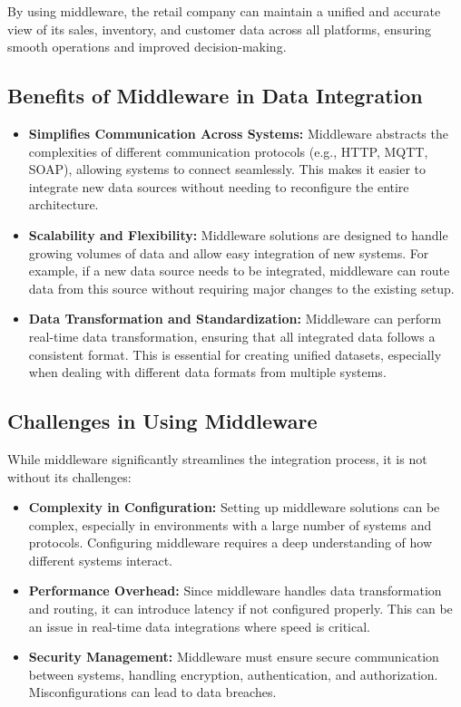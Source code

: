 \documentclass[12pt]{article}
\begin{document}
By using middleware, the retail company can maintain a unified and accurate view of its sales, inventory, and customer data across all platforms, ensuring smooth operations and improved decision-making.

\subsection{Benefits of Middleware in Data Integration}
\begin{itemize}
    \item \textbf{Simplifies Communication Across Systems:} Middleware abstracts the complexities of different communication protocols (e.g., HTTP, MQTT, SOAP), allowing systems to connect seamlessly. This makes it easier to integrate new data sources without needing to reconfigure the entire architecture.
    \item \textbf{Scalability and Flexibility:} Middleware solutions are designed to handle growing volumes of data and allow easy integration of new systems. For example, if a new data source needs to be integrated, middleware can route data from this source without requiring major changes to the existing setup.
    \item \textbf{Data Transformation and Standardization:} Middleware can perform real-time data transformation, ensuring that all integrated data follows a consistent format. This is essential for creating unified datasets, especially when dealing with different data formats from multiple systems.
\end{itemize}

\subsection{Challenges in Using Middleware}
While middleware significantly streamlines the integration process, it is not without its challenges:
\begin{itemize}
    \item \textbf{Complexity in Configuration:} Setting up middleware solutions can be complex, especially in environments with a large number of systems and protocols. Configuring middleware requires a deep understanding of how different systems interact.
    \item \textbf{Performance Overhead:} Since middleware handles data transformation and routing, it can introduce latency if not configured properly. This can be an issue in real-time data integrations where speed is critical.
    \item \textbf{Security Management:} Middleware must ensure secure communication between systems, handling encryption, authentication, and authorization. Misconfigurations can lead to data breaches.
\end{itemize}
\end{document}

